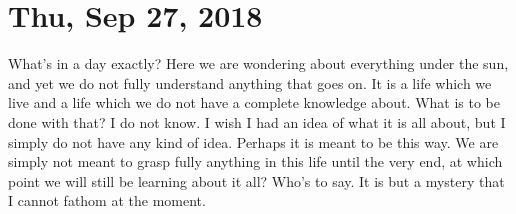\section{Thu, Sep 27, 2018}

What's in a day exactly? Here we are wondering about everything under the sun, and
yet we do not fully understand anything that goes on. It is a life which we live and
a life which we do not have a complete knowledge about. What is to be done with that?
I do not know. I wish I had an idea of what it is all about, but I simply do not have
any kind of idea. Perhaps it is meant to be this way. We are simply not meant to
grasp fully anything in this life until the very end, at which point we will still be
learning about it all? Who's to say. It is but a mystery that I cannot fathom at the
moment.